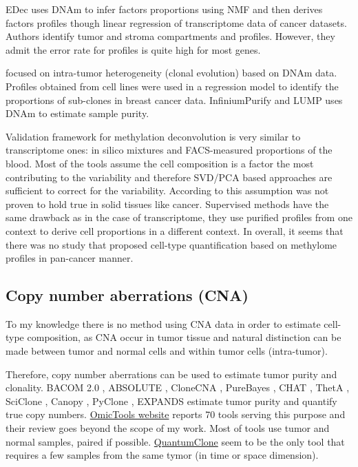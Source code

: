 \documentclass[12pt,]{book}
\theoremstyle{definition}
\theoremstyle{definition}
\theoremstyle{definition}
\theoremstyle{remark}
\begin{document}
EDec \citep{Onuchic2016} uses DNAm to infer factors proportions using
NMF and then derives factors profiles though linear regression of
transcriptome data of cancer datasets. Authors identify tumor and stroma
compartments and profiles. However, they admit the error rate for
profiles is quite high for most genes.

\citet{Wen2016} focused on intra-tumor heterogeneity (clonal evolution)
based on DNAm data. Profiles obtained from cell lines were used in a
regression model to identify the proportions of sub-clones in breast
cancer data. InfiniumPurify \citep{Zheng2017} and LUMP \citep{Aran2015}
uses DNAm to estimate sample purity.

Validation framework for methylation deconvolution is very similar to
transcriptome ones: in silico mixtures and FACS-measured proportions of
the blood. Most of the tools assume the cell composition is a factor the
most contributing to the variability and therefore SVD/PCA based
approaches are sufficient to correct for the variability. According to
\citet{Teschendorff2017} this assumption was not proven to hold true in
solid tissues like cancer. Supervised methods have the same drawback as
in the case of transcriptome, they use purified profiles from one
context to derive cell proportions in a different context. In overall,
it seems that there was no study that proposed cell-type quantification
based on methylome profiles in pan-cancer manner.

\hypertarget{copy-number-aberrations-cna}{%
\subsection{Copy number aberrations
(CNA)}\label{copy-number-aberrations-cna}}

To my knowledge there is no method using CNA data in order to estimate
cell-type composition, as CNA occur in tumor tissue and natural
distinction can be made between tumor and normal cells and within tumor
cells (intra-tumor).

Therefore, copy number aberrations can be used to estimate tumor purity
and clonality. BACOM 2.0 \citep{Fu2015}, ABSOLUTE \citep{Carter2012},
CloneCNA \citep{Yu2016}, PureBayes \citep{Larson2013}, CHAT
\citep{Li2014}, ThetA \citep{Oesper2013}, SciClone \citep{Miller2014},
Canopy \citep{Jiang2016}, PyClone \citep{Roth2014}, EXPANDS
\citep{Andor2014} estimate tumor purity and quantify true copy numbers.
\href{https://omictools.com/tumor-purity-and-heterogeneity-category}{OmicTools
website} reports 70 tools serving this purpose and their review goes
beyond the scope of my work. Most of tools use tumor and normal samples,
paired if possible.
\href{https://github.com/DeveauP/QuantumClone/}{QuantumClone} seem to be
the only tool that requires a few samples from the same tymor (in time
or space dimension).
\end{document}
